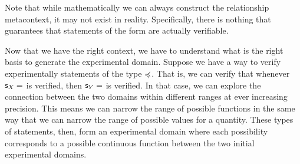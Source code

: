 \documentclass[11pt,letterpaper,fleqn]{memoir} %
\begin{document}
\begin{mathSection}
\begin{justification}
	Note that while mathematically we can always construct the relationship metacontext, it may not exist in reality. Specifically, there is nothing that guarantees that statements of the form  are actually verifiable.
\end{justification}
\end{mathSection}

Now that we have the right context, we have to understand what is the right basis to generate the experimental domain. Suppose we have a way to verify experimentally statements of the type $\preccurlyeq$. That is, we can verify that whenever $\mathsf{s}_X=$ is verified, then $\mathsf{s}_Y=$ is verified. In that case, we can explore the connection between the two domains within different ranges at ever increasing precision. This means we can narrow the range of possible functions in the same way that we can narrow the range of possible values for a quantity. These types of statements, then, form an experimental domain where each possibility corresponds to a possible continuous function between the two initial experimental domains.
\end{document}
